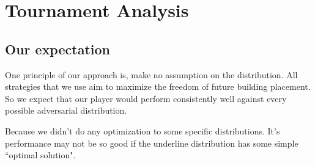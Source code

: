 \section{Tournament Analysis}

\subsection{Our expectation}
One principle of our approach is, make no assumption on the distribution.
All strategies that we use aim to maximize the freedom of future building placement.
So we expect that our player would perform consistently well against every possible adversarial distribution.

Because we didn't do any optimization to some specific distributions. It's performance may not be so good if
the underline distribution has some simple ``optimal solution".


